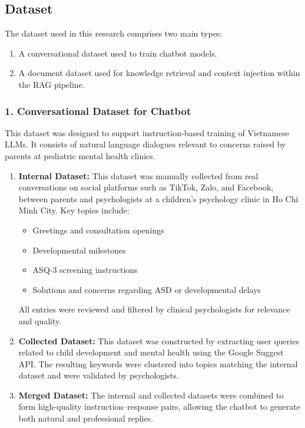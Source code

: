 \documentclass[conference]{IEEEtran}
\begin{document}
\subsection{Dataset}

The dataset used in this research comprises two main types: 
\begin{enumerate}
    \item A conversational dataset used to train chatbot models.
    \item A document dataset used for knowledge retrieval and context injection within the RAG pipeline.
\end{enumerate}
\subsubsection*{1. Conversational Dataset for Chatbot}

This dataset was designed to support instruction-based training of Vietnamese LLMs. It consists of natural language dialogues relevant to concerns raised by parents at pediatric mental health clinics.

\begin{enumerate}
    \item \textbf{Internal Dataset:} This dataset was manually collected from real conversations on social platforms such as TikTok, Zalo, and Facebook, between parents and psychologists at a children's psychology clinic in Ho Chi Minh City. Key topics include:
    \begin{itemize}
        \item Greetings and consultation openings
        \item Developmental milestones
        \item ASQ-3 screening instructions
        \item Solutions and concerns regarding ASD or developmental delays
    \end{itemize}
    All entries were reviewed and filtered by clinical psychologists for relevance and quality.

    \item \textbf{Collected Dataset:} This dataset was constructed by extracting user queries related to child development and mental health using the Google Suggest API. The resulting keywords were clustered into topics matching the internal dataset and were validated by psychologists.

    \item \textbf{Merged Dataset:} The internal and collected datasets were combined to form high-quality instruction–response pairs, allowing the chatbot to generate both natural and professional replies.
\end{enumerate}
\end{document}
